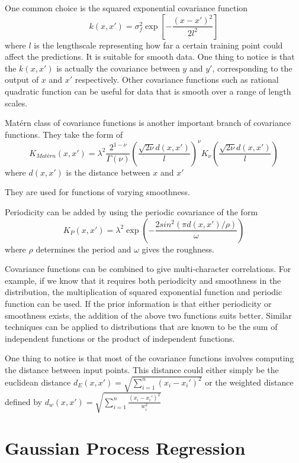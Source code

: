 \documentclass[14pt]{report}
\numberwithin{equation}{chapter}
\begin{document}
\begin{spacing}{2}
One common choice is the squared exponential covariance function
\[k(x,x\prime) = \sigma_f^2\operatorname{exp}\left[-\frac{(x-x\prime)^2}{2l^2}\right]\]
where $l$ is the lengthscale representing how far a certain training point could affect the predictions. It is suitable for smooth data. One thing to notice is that the $k(x,x\prime)$ is actually the covariance between $y$ and $y\prime$, corresponding to the output of $x$ and $x\prime$ respectively. Other covariance functions such as rational quadratic function can be useful for data that is smooth over a range of length scales.

Matérn class of covariance functions is another important branch of covariance functions. They take the form of 
\[K_{Matérn}(x,x\prime) = \lambda^2 \frac{2^{1-\nu}}{\Gamma(\nu)}\left(\frac{\sqrt{2\nu} d(x,x\prime)}{l}\right)^\nu K_\nu \left(\frac{\sqrt{2\nu} d(x,x\prime)}{l}\right)\]
where $d(x,x\prime)$ is the distance between $x$ and $x\prime$

They are used for functions of varying smoothness. 

Periodicity can be added by using the periodic covariance of the form
\[K_P(x,x\prime) = \lambda^2 \operatorname{exp}\left(- \frac{2sin^2\left(\pi d(x,x\prime)/\rho\right)}{\omega}\right)\] 
where $\rho$ determines the period and $\omega$ gives the roughness.

Covariance functions can be combined to give multi-character correlations. For example, if we know that it requires both periodicity and smoothness in the distribution, the multiplication of squared exponential function and periodic function can be used. If the prior information is that either periodicity or smoothness exists, the addition of the above two functions suits better. Similar techniques can be applied to distributions that are known to be the sum of independent functions or the product of independent functions.

One thing to notice is that most of the covariance functions involves computing the distance between input points. This distance could either simply be the euclidean distance $d_E(x,x\prime) = \sqrt{\sum\limits_{i=1}^n(x_i - x_i\prime)^2}$ or the weighted distance defined by $d_w(x,x\prime) = \sqrt{\sum\limits_{i=1}^n\frac{(x_i - x_i\prime)^2}{w_i^2}}$


\section{Gaussian Process Regression}


\end{spacing}
\end{document}
